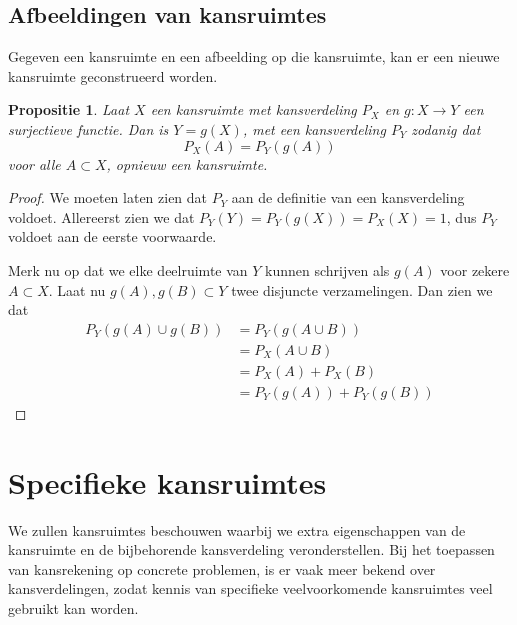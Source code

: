 \documentclass[a4paper]{report}
\newtheorem{proposition}[theorem]{Propositie}
\theoremstyle{definition}
\begin{document}
\section{Afbeeldingen van kansruimtes}
Gegeven een kansruimte en een afbeelding op die kansruimte, kan er een nieuwe kansruimte geconstrueerd worden.

\begin{proposition}
    Laat $X$ een kansruimte met kansverdeling $P_X$ en $g: X \to Y$ een surjectieve functie.
    Dan is $Y = g(X)$, met een kansverdeling $P_Y$ zodanig dat
    \[ P_X(A) = P_Y(g(A)) \]
    voor alle $A \subset X$, opnieuw een kansruimte.
\end{proposition}
\begin{proof}
    We moeten laten zien dat $P_Y$ aan de definitie van een kansverdeling voldoet.
    Allereerst zien we dat $P_Y(Y) = P_Y(g(X)) = P_X(X) = 1$, dus $P_Y$ voldoet aan de eerste voorwaarde.

    Merk nu op dat we elke deelruimte van $Y$ kunnen schrijven als $g(A)$ voor zekere $A \subset X$.
    Laat nu $g(A),g(B) \subset Y$ twee disjuncte verzamelingen.
    Dan zien we dat
    \begin{align*}
        P_Y(g(A) \cup g(B)) &= P_Y(g(A \cup B)) \\
                            &= P_X(A \cup B) \\
                            &= P_X(A) + P_X(B) \\
                            &= P_Y(g(A)) + P_Y(g(B))
    \end{align*}
\end{proof}


\chapter{Specifieke kansruimtes}

We zullen kansruimtes beschouwen waarbij we extra eigenschappen van de kansruimte en de bijbehorende kansverdeling veronderstellen.
Bij het toepassen van kansrekening op concrete problemen, is er vaak meer bekend over kansverdelingen, zodat kennis van specifieke veelvoorkomende kansruimtes veel gebruikt kan worden.
%
%
%
%
\end{document}
